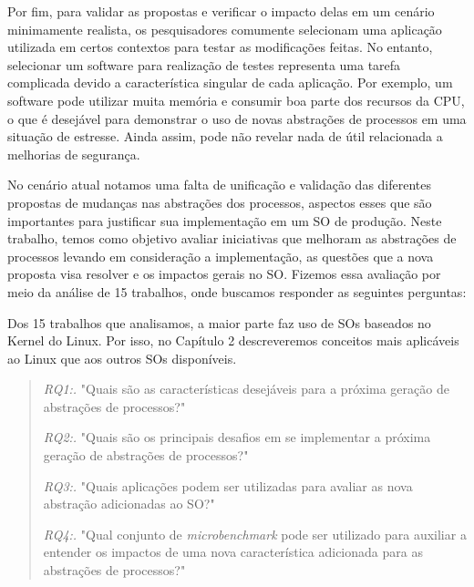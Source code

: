 Por fim, para validar as propostas e verificar o impacto delas em um cenário
minimamente realista, os pesquisadores comumente selecionam uma aplicação
utilizada em certos contextos para testar as modificações feitas. No entanto,
selecionar um software para realização de testes representa uma tarefa
complicada devido a característica singular de cada aplicação. Por exemplo, um
software pode utilizar muita memória e consumir boa parte dos recursos da CPU,
o que é desejável para demonstrar o uso de novas abstrações de processos em uma
situação de estresse. Ainda assim, pode não revelar nada de útil relacionada a
melhorias de segurança.

No cenário atual notamos uma falta de unificação e validação das diferentes
propostas de mudanças nas abstrações dos processos, aspectos esses que são
importantes para justificar sua implementação em um SO de produção. Neste
trabalho, temos como objetivo avaliar iniciativas que melhoram as abstrações de
processos levando em consideração a implementação, as questões que a nova
proposta visa resolver e os impactos gerais no SO. Fizemos essa avaliação por
meio da análise de 15 trabalhos, onde buscamos responder as seguintes
perguntas:

Dos 15 trabalhos que analisamos, a maior parte faz uso de SOs baseados no Kernel do Linux. Por isso, no Capítulo 2 descreveremos conceitos mais aplicáveis ao Linux que aos outros SOs disponíveis.

\begin{quote}
 \item \textit{RQ1:.} "Quais são as características desejáveis para a próxima geração de abstrações de processos?"
 \item \textit{RQ2:.} "Quais são os principais desafios em se implementar a próxima geração de abstrações de processos?"
 \item \textit{RQ3:.} "Quais aplicações podem ser utilizadas para avaliar as nova abstração adicionadas ao SO?"
 \item \textit{RQ4:.} "Qual conjunto de \emph{microbenchmark} pode ser utilizado para auxiliar a entender os impactos de uma nova característica adicionada para as abstrações de processos?"
\end{quote}

